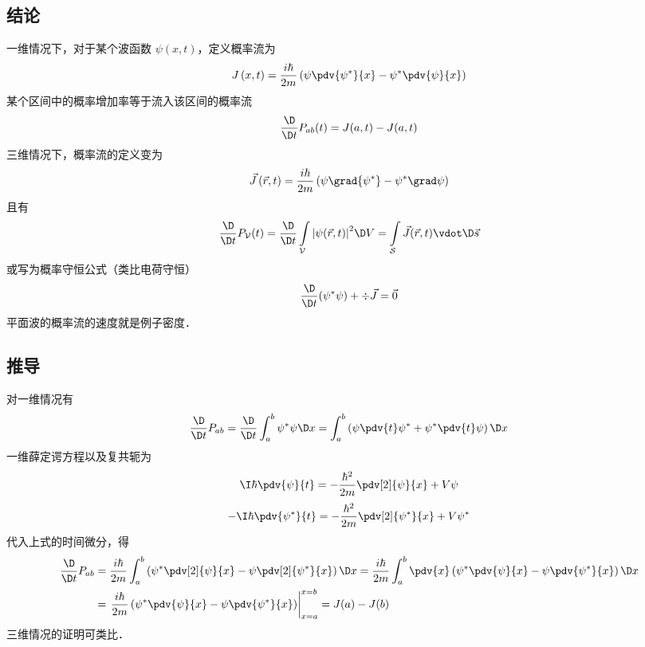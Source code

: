 

\subsection{结论}
一维情况下，对于某个波函数 $\psi \left( {x,t} \right)$，定义概率流为
\begin{equation}
J\left( {x,t} \right) = \frac{{i\hbar }}{{2m}}\left( {\psi \pdv{\psi^*}{x} - {\psi ^ * } \pdv{\psi}{x}} \right)
\end{equation}
某个区间中的概率增加率等于流入该区间的概率流
\begin{equation}
\frac{\D}{{\D t}}{P_{ab}}(t) = J(a,t) - J(a,t)
\end{equation}
三维情况下，概率流的定义变为
\begin{equation}
\vec J\left( {\vec r,t} \right) = \frac{{i\hbar }}{{2m}}\left( {\psi \grad {\psi ^ * } - {\psi ^ * }\grad \psi } \right)
\end{equation}
且有
\begin{equation}
\frac{\D}{{\D t}}{P_\mathcal{V}}(t) = \frac{\D}{{\D t}}\int\limits_\mathcal{V} {{{\left| {\psi (\vec r,t)} \right|}^2}\D V}  = \int\limits_\mathcal{S} {\vec J(\vec r,t) \vdot \D\vec s}
\end{equation}
或写为概率守恒公式（类比电荷守恒） %
\begin{equation}
\frac{\D}{{\D t}}({\psi ^ * }\psi ) + \div\vec J = \vec 0
\end{equation}
平面波的概率流的速度就是例子密度．

\subsection{推导}

对一维情况有
\begin{equation}
\frac{\D}{{\D t}}{P_{ab}} = \frac{\D}{{\D t}}\int_a^b {{\psi ^ * }\psi \D x}  = \int_a^b {\left( {\psi \pdv{t} \psi^* + {\psi ^ * } \pdv{t} \psi } \right)\D x}
\end{equation}
一维薛定谔方程以及复共轭为
\begin{equation}
\I\hbar \pdv{\psi}{t} =  - \frac{{{\hbar ^2}}}{{2m}} \pdv[2]{\psi}{x} + V\psi
\end{equation}
\begin{equation}
- \I\hbar \pdv{\psi^*}{t} =  - \frac{{{\hbar ^2}}}{{2m}} \pdv[2]{\psi^*}{x} + V{\psi^* }
\end{equation}
代入上式的时间微分，得
\begin{equation}
\begin{aligned}
\frac{\D}{{\D t}}{P_{ab}} &= \frac{{i\hbar }}{{2m}}\int_a^b {\left( {{\psi ^ * } \pdv[2]{\psi}{x} - \psi \pdv[2]{\psi^*}{x}} \right)\D x}  = \frac{{i\hbar }}{{2m}}\int_a^b {\pdv{x} \left( {{\psi ^ * }\pdv{\psi}{x} - \psi \pdv{\psi^*}{x}} \right)\D x} \\
   &= \left. {\frac{{i\hbar }}{{2m}}\left( {{\psi ^ * }\pdv{\psi}{x} - \psi \pdv{\psi^*}{x}} \right)} \right|_{x = a}^{x = b} = J(a) - J(b)
\end{aligned}
\end{equation}
三维情况的证明可类比．

